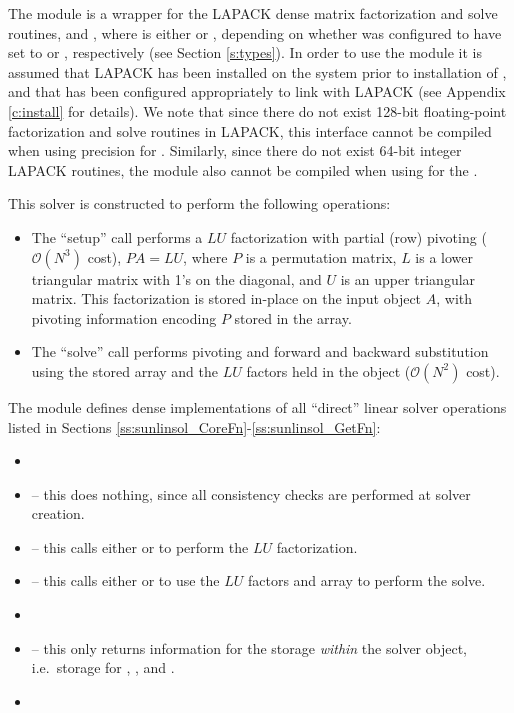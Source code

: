{\warn} The {\sunlinsollapdense} module is a {\sunlinsol} wrapper for
the LAPACK dense matrix factorization and solve routines, 
and , where \id{*} is either  or , depending on
whether {\sundials} was configured to have  set to
 or , respectively (see Section \ref{s:types}).
In order to use the {\sunlinsollapdense} module it is assumed
that LAPACK has been installed on the system prior to installation of
{\sundials}, and that {\sundials} has been configured appropriately to
link with LAPACK (see Appendix \ref{c:install} for details).  
We note that since there do not exist 128-bit floating-point
factorization and solve routines in LAPACK, this interface cannot be
compiled when using  precision for .
Similarly, since there do not exist 64-bit integer LAPACK routines,
the {\sunlinsollapdense} module also cannot be compiled when using
 for the .

This solver is constructed to perform the following operations:
\begin{itemize}
\item The ``setup'' call performs a $LU$ factorization with
  partial (row) pivoting ($\mathcal O(N^3)$ cost), $PA=LU$, where $P$
  is a permutation matrix, $L$ is a lower triangular matrix with 1's
  on the diagonal, and $U$ is an upper triangular matrix.  This
  factorization is stored in-place on the input {\sunmatdense} object
  $A$, with pivoting information encoding $P$ stored in
  the  array.
\item The ``solve'' call performs pivoting and forward and
  backward substitution using the stored  array and the
  $LU$ factors held in the {\sunmatdense} object ($\mathcal O(N^2)$
  cost).
\end{itemize}


\noindent The {\sunlinsollapdense} module defines dense implementations of all
``direct'' linear solver operations listed in Sections
\ref{ss:sunlinsol_CoreFn}-\ref{ss:sunlinsol_GetFn}:
\begin{itemize}
\item {}
\item {} -- this does nothing, since all
  consistency checks are performed at solver creation.
\item {} -- this calls either
   or  to perform the $LU$ factorization.
\item {} -- this calls either
   or  to use the $LU$ factors and 
  array to perform the solve.
\item {}
\item {} -- this only returns information for
  the storage \emph{within} the solver object, i.e.~storage
  for , , and .
\item {}
\end{itemize}

